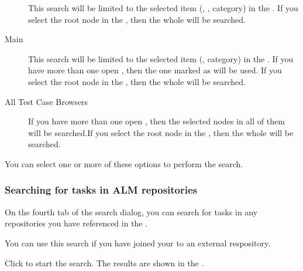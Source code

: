 \begin{description}
\item [\gdtestsuitebrowser{}]{This search will be limited to the selected item (\gdsuite{}, \gdjob{}, category) in the \gdtestsuitebrowser{}. If you select the root node in the \gdtestsuitebrowser{}, then the whole \gdtestsuitebrowser{} will be searched. }
\item [Main \gdtestcasebrowser{}]{This search will be limited to the selected item (\gdcase{}, category) in the \gdtestcasebrowser{}. If you have more than one \gdtestcasebrowser{} open , then the one marked as  will be used. If you select the root node in the \gdtestcasebrowser{}, then the whole \gdtestcasebrowser{} will be searched.}
\item [All Test Case Browsers]{If you have more than one \gdtestcasebrowser{} open , then the selected nodes in all of them will be searched.If you select the root node in the \gdtestcasebrowser{}, then the whole \gdtestcasebrowser{} will be searched.  }
\end{description}

You can select one or more of these options to perform the search. 

\subsubsection{Searching for tasks in ALM repositories}
\label{TasksSearchTasks}

On the fourth tab of the search dialog, you can search for tasks in any repositories you have referenced in the \gdproject{}.

You can use this search if you have joined your \gdproject{} to an external respository.

Click  to start the search. The results are shown in the \gdsearchresultview{} . 
